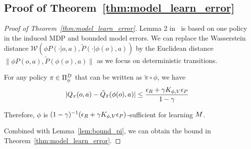 \subsection{Proof of Theorem~\ref{thm:model_learn_error}}
\label{proof:model_learn_error}





\begin{proof}[Proof of Theorem~\ref{thm:model_learn_error}]

Lemma 2 in~\citet{gelada2019deepmdp} is based on one policy in the induced MDP and bounded model errors. We can replace the Wasserstein distance $\mathcal{W}(\phi P(\cdot|o,a), \tilde{P}(\cdot|\phi(o),a))$ by the Euclidean distance $\| \phi P(o,a), \tilde{P}(\phi(o),a) \|$ as we focus on deterministic transitions.

For any policy $\pi\in\Pi_{\phi}^D$ that can be written as $\tilde{\pi}\circ\phi$, we have
\begin{equation}
    | Q_{\pi}(o,a) - \tilde{Q}_{\tilde{\pi}}(\phi(o),a) | \leq \frac{\epsilon_R + \gamma K_{\phi,V} \epsilon_P}{1-\gamma}
\end{equation}

Therefore, $\phi$ is $(1-\gamma)^{-1}(\epsilon_R+\gamma K_{\phi,V}\epsilon_P)$-sufficient for learning $M$. 

Combined with Lemma~\ref{lem:bound_pi}, we can obtain the bound in Theorem~\ref{thm:model_learn_error}.

\end{proof}



